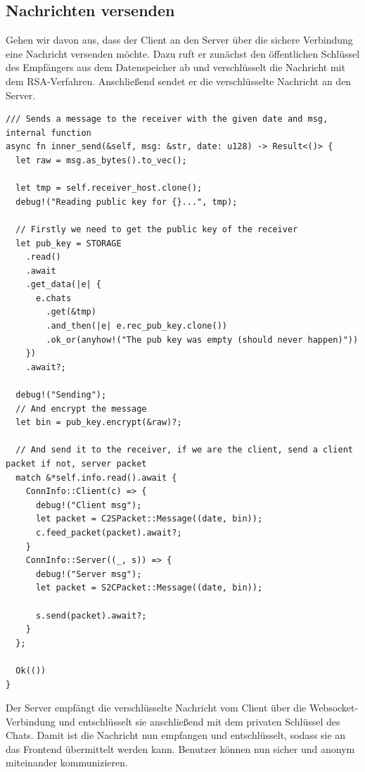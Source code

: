 \documentclass[a4paper,ngerman, headheight=28pt,12pt]{scrartcl}
\begin{document}
\subsection{Nachrichten versenden}
Gehen wir davon aus, dass der Client an den Server über die sichere Verbindung eine Nachricht versenden möchte. Dazu ruft er zunächst den öffentlichen Schlüssel des Empfängers aus dem Datenspeicher ab und verschlüsselt die Nachricht mit dem RSA-Verfahren. Anschließend sendet er die verschlüsselte Nachricht an den Server.
\begin{verbatim}
/// Sends a message to the receiver with the given date and msg, internal function
async fn inner_send(&self, msg: &str, date: u128) -> Result<()> {
  let raw = msg.as_bytes().to_vec();

  let tmp = self.receiver_host.clone();
  debug!("Reading public key for {}...", tmp);

  // Firstly we need to get the public key of the receiver
  let pub_key = STORAGE
    .read()
    .await
    .get_data(|e| {
      e.chats
        .get(&tmp)
        .and_then(|e| e.rec_pub_key.clone())
        .ok_or(anyhow!("The pub key was empty (should never happen)"))
    })
    .await?;

  debug!("Sending");
  // And encrypt the message
  let bin = pub_key.encrypt(&raw)?;

  // And send it to the receiver, if we are the client, send a client packet if not, server packet
  match &*self.info.read().await {
    ConnInfo::Client(c) => {
      debug!("Client msg");
      let packet = C2SPacket::Message((date, bin));
      c.feed_packet(packet).await?;
    }
    ConnInfo::Server((_, s)) => {
      debug!("Server msg");
      let packet = S2CPacket::Message((date, bin));

      s.send(packet).await?;
    }
  };

  Ok(())
}
\end{verbatim}
Der Server empfängt die verschlüsselte Nachricht vom Client über die Websocket-Verbindung und entschlüsselt sie anschließend mit dem privaten Schlüssel des Chats. Damit ist die Nachricht nun empfangen und entschlüsselt, sodass sie an das Frontend übermittelt werden kann. Benutzer können nun sicher und anonym miteinander kommunizieren.
\end{document}
